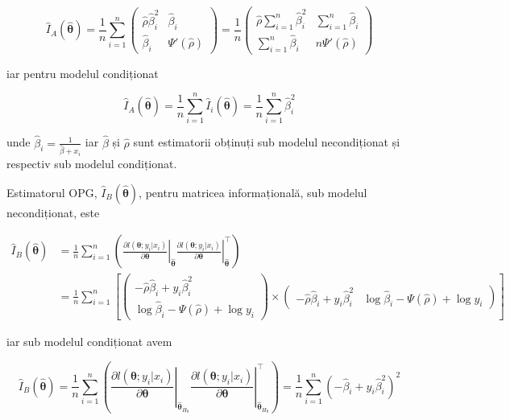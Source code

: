 \documentclass[]{article}
\begin{document}
\[
\hat{I}_{A}(\hat{\boldsymbol{\theta}}) = \frac{1}{n}\sum_{i = 1}^{n}\begin{pmatrix}\hat{\rho}\hat{\beta}_i^2 & \hat{\beta}_i\\ \hat{\beta}_i & \Psi'(\hat{\rho})\end{pmatrix} = \frac{1}{n}\begin{pmatrix}\hat{\rho}\sum_{i = 1}^{n}\hat{\beta}_i^2 & \sum_{i = 1}^{n}\hat{\beta}_i\\ \sum_{i = 1}^{n}\hat{\beta}_i & n\Psi'(\hat{\rho})\end{pmatrix}
\]

iar pentru modelul condiționat

\[
\hat{I}_{A}(\hat{\boldsymbol{\theta}}) = \frac{1}{n}\sum_{i = 1}^{n}\hat{I}_{i}(\hat{\boldsymbol{\theta}}) = \frac{1}{n}\sum_{i = 1}^{n} \hat{\beta}_{i}^2
\]

unde \(\hat{\beta}_i = \frac{1}{\hat{\beta} + x_i}\) iar \(\hat{\beta}\)
și \(\hat{\rho}\) sunt estimatorii obținuți sub modelul necondiționat și
respectiv sub modelul condiționat.

Estimatorul OPG, \(\hat{I}_{B}(\hat{\boldsymbol{\theta}})\), pentru
matricea informațională, sub modelul necondiționat, este

\begin{align*}
\hat{I}_{B}(\hat{\boldsymbol{\theta}}) &= \frac{1}{n}\sum_{i=1}^{n}\left(\left.\frac{\partial l(\boldsymbol{\theta};y_i|x_i)}{\partial \boldsymbol{\theta}}\right\rvert_{\hat{\boldsymbol{\theta}}}\left.\frac{\partial l(\boldsymbol{\theta};y_i|x_i)}{\partial \boldsymbol{\theta}}\right\rvert_{\hat{\boldsymbol{\theta}}}^\intercal\right) \\
  &= \frac{1}{n}\sum_{i = 1}^{n}\left[\begin{pmatrix}-\hat{\rho}\hat{\beta}_i + y_i\hat{\beta}_i^2 \\ \log{\hat{\beta}_i} - \Psi(\hat{\rho}) + \log{y_i}\end{pmatrix} \times \begin{pmatrix}-\hat{\rho}\hat{\beta}_i + y_i\hat{\beta}_i^2 & \log{\hat{\beta}_i} - \Psi(\hat{\rho}) + \log{y_i}\end{pmatrix}\right]
\end{align*}

iar sub modelul condiționat avem

\[
\hat{I}_{B}(\hat{\boldsymbol{\theta}}) = \frac{1}{n}\sum_{i=1}^{n}\left(\left.\frac{\partial l(\boldsymbol{\theta};y_i|x_i)}{\partial \boldsymbol{\theta}}\right\rvert_{\hat{\boldsymbol{\theta}}_{H_0}}\left.\frac{\partial l(\boldsymbol{\theta};y_i|x_i)}{\partial \boldsymbol{\theta}}\right\rvert_{\hat{\boldsymbol{\theta}}_{H_0}}^\intercal\right) = \frac{1}{n}\sum_{i = 1}^{n} \left(-\hat{\beta}_i + y_i\hat{\beta}_i^2\right)^2
\]
\end{document}
